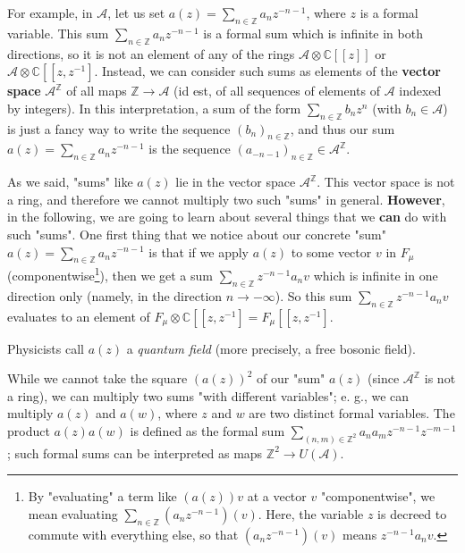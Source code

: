 \documentclass
[numbers=enddot,12pt,final,onecolumn,german,notitlepage]{scrartcl}%
\theoremstyle{definition}
\begin{document}
For example, in $\mathcal{A}$, let us set $a\left(  z\right)  =\sum
\limits_{n\in\mathbb{Z}}a_{n}z^{-n-1}$, where $z$ is a formal variable. This
sum $\sum\limits_{n\in\mathbb{Z}}a_{n}z^{-n-1}$ is a formal sum which is
infinite in both directions, so it is not an element of any of the rings
$\mathcal{A}\otimes\mathbb{C}\left[  \left[  z\right]  \right]  $ or
$\mathcal{A}\otimes\mathbb{C}\left[  \left[  z,z^{-1}\right.  \right]  $.
Instead, we can consider such sums as elements of the \textbf{vector space}
$\mathcal{A}^{\mathbb{Z}}$ of all maps $\mathbb{Z}\rightarrow\mathcal{A}$ (id
est, of all sequences of elements of $\mathcal{A}$ indexed by integers). In
this interpretation, a sum of the form $\sum\limits_{n\in\mathbb{Z}}b_{n}%
z^{n}$ (with $b_{n}\in\mathcal{A}$) is just a fancy way to write the sequence
$\left(  b_{n}\right)  _{n\in\mathbb{Z}}$, and thus our sum $a\left(
z\right)  =\sum\limits_{n\in\mathbb{Z}}a_{n}z^{-n-1}$ is the sequence $\left(
a_{-n-1}\right)  _{n\in\mathbb{Z}}\in\mathcal{A}^{\mathbb{Z}}$.

As we said, "sums" like $a\left(  z\right)  $ lie in the vector space
$\mathcal{A}^{\mathbb{Z}}$. This vector space is not a ring, and therefore we
cannot multiply two such "sums" in general. \textbf{However}, in the
following, we are going to learn about several things that we \textbf{can} do
with such "sums". One first thing that we notice about our concrete "sum"
$a\left(  z\right)  =\sum\limits_{n\in\mathbb{Z}}a_{n}z^{-n-1}$ is that if we
apply $a\left(  z\right)  $ to some vector $v$ in $F_{\mu}$
(componentwise\footnote{By "evaluating" a term like $\left(  a\left(
z\right)  \right)  v$ at a vector $v$ "componentwise", we mean evaluating
$\sum\limits_{n\in\mathbb{Z}}\left(  a_{n}z^{-n-1}\right)  \left(  v\right)
$. Here, the variable $z$ is decreed to commute with everything else, so that
$\left(  a_{n}z^{-n-1}\right)  \left(  v\right)  $ means $z^{-n-1}a_{n}v$.}),
then we get a sum $\sum\limits_{n\in\mathbb{Z}}z^{-n-1}a_{n}v$ which is
infinite in one direction only (namely, in the direction $n\rightarrow-\infty
$). So this sum $\sum\limits_{n\in\mathbb{Z}}z^{-n-1}a_{n}v$ evaluates to an
element of $F_{\mu}\otimes\mathbb{C}\left[  \left[  z,z^{-1}\right.  \right]
=F_{\mu}\left[  \left[  z,z^{-1}\right.  \right]  $.

Physicists call $a\left(  z\right)  $ a \textit{quantum field} (more
precisely, a free bosonic field).

While we cannot take the square $\left(  a\left(  z\right)  \right)  ^{2}$ of
our "sum" $a\left(  z\right)  $ (since $\mathcal{A}^{\mathbb{Z}}$ is not a
ring), we can multiply two sums "with different variables"; e. g., we can
multiply $a\left(  z\right)  $ and $a\left(  w\right)  $, where $z$ and $w$
are two distinct formal variables. The product $a\left(  z\right)  a\left(
w\right)  $ is defined as the formal sum $\sum\limits_{\left(  n,m\right)
\in\mathbb{Z}^{2}}a_{n}a_{m}z^{-n-1}z^{-m-1}$; such formal sums can be
interpreted as maps $\mathbb{Z}^{2}\rightarrow U\left(  \mathcal{A}\right)  $.
\end{document}
